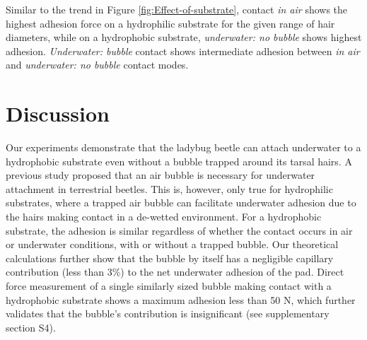 \documentclass[vruler,JEB]{COB}%
\begin{document}
Similar to the trend in Figure \ref{fig:Effect-of-substrate}, contact
\emph{in air} shows the highest adhesion force on a hydrophilic substrate
for the given range of hair diameters, while on a hydrophobic substrate,
\emph{underwater: no bubble} shows highest adhesion. \emph{Underwater:
bubble} contact shows intermediate adhesion between \emph{in air}
and \emph{underwater: no bubble} contact modes.


\section{Discussion}

Our experiments demonstrate that the ladybug beetle can attach underwater
to a hydrophobic substrate even without a bubble trapped around its
tarsal hairs. A previous study\citep{RN87} proposed that an air bubble
is necessary for underwater attachment in terrestrial beetles. This is, however,
only true for hydrophilic substrates, where a trapped air bubble can facilitate
underwater adhesion due to the hairs making contact in a de-wetted
environment. For a hydrophobic substrate, the adhesion is similar
regardless of whether the contact occurs in air or underwater conditions,
with or without a trapped bubble. Our theoretical calculations further
show that the bubble by itself has a negligible capillary contribution (less than 3\%)
to the net underwater adhesion of the pad. Direct force measurement
of a single similarly sized bubble making contact with a hydrophobic
substrate shows a maximum adhesion less than 50 \textmu N, which
further validates that the bubble's contribution is insignificant
(see supplementary section S4).
\end{document}
